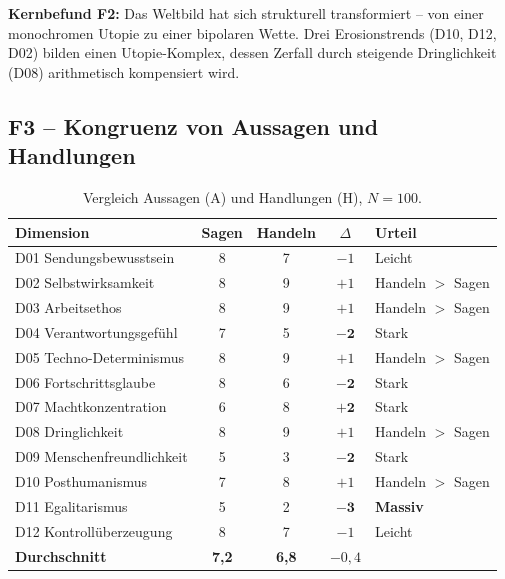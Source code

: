 \documentclass[12pt,a4paper]{article}
\begin{document}
\medskip
\noindent\textbf{Kernbefund F2:} Das Weltbild hat sich strukturell transformiert -- von einer monochromen Utopie zu einer bipolaren Wette. Drei Erosionstrends (D10, D12, D02) bilden einen \glqq Utopie-Komplex\grqq, dessen Zerfall durch steigende Dringlichkeit (D08) arithmetisch kompensiert wird.


\subsection{F3 -- Kongruenz von Aussagen und Handlungen}
\label{sec:ergebnisse:f3}

\begin{table}[htbp]
  \centering
  \caption{Vergleich Aussagen (A) und Handlungen (H), $N=100$.}
  \label{tab:kongruenz}
  \begin{tabular}{l c c c l}
    \toprule
    \textbf{Dimension} & \textbf{Sagen} & \textbf{Handeln} & $\Delta$ & \textbf{Urteil} \\
    \midrule
    D01 Sendungsbewusstsein     & 8 & 7 & $-1$ & Leicht \\
    D02 Selbstwirksamkeit       & 8 & 9 & $+1$ & Handeln $>$ Sagen \\
    D03 Arbeitsethos            & 8 & 9 & $+1$ & Handeln $>$ Sagen \\
    D04 Verantwortungsgef\"uhl  & 7 & 5 & $\mathbf{-2}$ & Stark \\
    D05 Techno-Determinismus    & 8 & 9 & $+1$ & Handeln $>$ Sagen \\
    D06 Fortschrittsglaube      & 8 & 6 & $\mathbf{-2}$ & Stark \\
    D07 Machtkonzentration      & 6 & 8 & $\mathbf{+2}$ & Stark \\
    D08 Dringlichkeit           & 8 & 9 & $+1$ & Handeln $>$ Sagen \\
    D09 Menschenfreundlichkeit  & 5 & 3 & $\mathbf{-2}$ & Stark \\
    D10 Posthumanismus          & 7 & 8 & $+1$ & Handeln $>$ Sagen \\
    D11 Egalitarismus           & 5 & 2 & $\mathbf{-3}$ & \textbf{Massiv} \\
    D12 Kontroll\"uberzeugung   & 8 & 7 & $-1$ & Leicht \\
    \midrule
    \textbf{Durchschnitt}       & \textbf{7,2} & \textbf{6,8} & $-0{,}4$ & \\
    \bottomrule
  \end{tabular}
\end{table}
\end{document}
